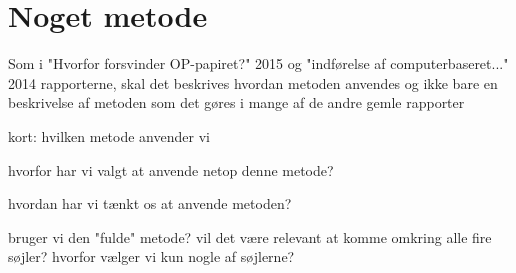 \section{Noget metode}

Som i "Hvorfor forsvinder OP-papiret?" 2015 og "indførelse af computerbaseret..." 2014 rapporterne, skal det beskrives hvordan metoden anvendes og ikke bare en beskrivelse af metoden som det gøres i mange af de andre gemle rapporter

\item kort: hvilken metode anvender vi
\item hvorfor har vi valgt at anvende netop denne metode?
\item hvordan har vi tænkt os at anvende metoden?
\item bruger vi den "fulde" metode? vil det være relevant at komme omkring alle fire søjler? hvorfor vælger vi kun nogle af søjlerne? 